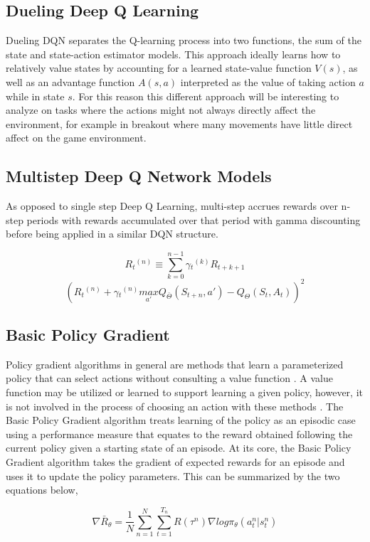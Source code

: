 \documentclass[conference]{IEEEtran}
\begin{document}
\subsection{Dueling Deep Q Learning}
Dueling DQN separates the Q-learning process into two functions, the sum of the state and state-action estimator models. This approach ideally learns how to relatively value states by accounting for a learned state-value function $V(s)$, as well as an advantage function $A(s,a)$ interpreted as the value of taking action $a$ while in state $s$. For this reason this different approach will be interesting to analyze on tasks where the actions might not always directly affect the environment, for example in breakout where many movements have little direct affect on the game environment.

\subsection{Multistep Deep Q Network Models}
As opposed to single step Deep Q Learning, multi-step accrues rewards over n-step periods with rewards accumulated over that period with gamma discounting before being applied in a similar DQN structure.

$$R{_{t}}^{(n)} \equiv \sum_{k=0}^{n-1} \gamma {_{t}}^{(k)}R_{t+k+1}$$
$$(R{_{t}}^{(n)} + \gamma {_{t}}^{(n)} \underset{{a}'}{max}Q_{\bar{\Theta }}(S_{t+n},{a}')-Q_{\Theta }(S_{t},A_{t}))^{2}$$

\subsection{Basic Policy Gradient}
Policy gradient algorithms in general are methods that learn a parameterized policy that can select actions without consulting a value function \cite{ReinforcementLearningBook}.
A value function may be utilized or learned to support learning a given policy, however, it is not involved in the process of choosing an action with these methods \cite{ReinforcementLearningBook}.
The Basic Policy Gradient algorithm treats learning of the policy as an episodic case using a performance measure that equates to the reward obtained following the current policy given a starting state of an episode. 
At its core, the Basic Policy Gradient algorithm takes the gradient of expected rewards for an episode and uses it to update the policy parameters.
This can be summarized by the two equations below,

$$\nabla \bar{R}_{\theta} = \frac{1}{N} \sum \limits_{n=1}^N \sum \limits_{t=1}^{T_n} R(\tau^n) \nabla log\pi_{\theta}(a_{t}^n | s_{t}^n)$$
\end{document}

